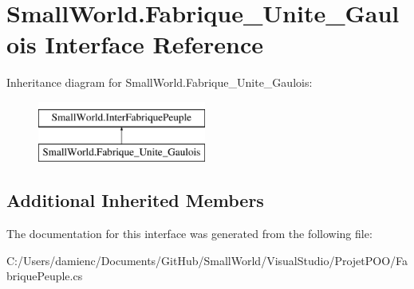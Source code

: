 \hypertarget{interface_small_world_1_1_fabrique___unite___gaulois}{\section{Small\-World.\-Fabrique\-\_\-\-Unite\-\_\-\-Gaulois Interface Reference}
\label{interface_small_world_1_1_fabrique___unite___gaulois}
}
Inheritance diagram for Small\-World.\-Fabrique\-\_\-\-Unite\-\_\-\-Gaulois\-:\begin{figure}[H]
\begin{center}
\leavevmode
\includegraphics[height=2.000000cm]{interface_small_world_1_1_fabrique___unite___gaulois}
\end{center}
\end{figure}
\subsection*{Additional Inherited Members}


The documentation for this interface was generated from the following file\-:\begin{DoxyCompactItemize}
\item 
C\-:/\-Users/damienc/\-Documents/\-Git\-Hub/\-Small\-World/\-Visual\-Studio/\-Projet\-P\-O\-O/Fabrique\-Peuple.\-cs\end{DoxyCompactItemize}
